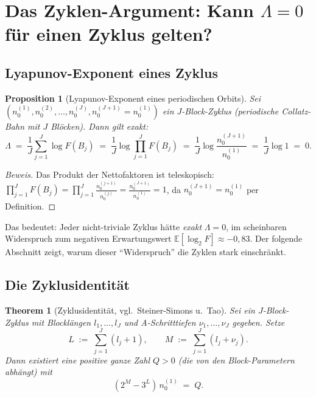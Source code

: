 \documentclass[12pt,a4paper]{article}
\newtheorem{proposition}[definition]{Proposition}
\newtheorem{theorem}[definition]{Theorem}
\newenvironment{beweis}{\begin{proof}[Beweis]}{\end{proof}}
\newcommand{\E}{\mathbb{E}}
\newcommand{\logt}{\log_2}        %
\begin{document}
\section{Das Zyklen-Argument: Kann \texorpdfstring{$\Lambda = 0$}{Lambda = 0} für einen Zyklus gelten?}
\label{sec:zyklen}

\subsection{Lyapunov-Exponent eines Zyklus}

\begin{proposition}[Lyapunov-Exponent eines periodischen Orbits]
\label{prop:zyklus-lambda}
Sei $(n_0^{(1)}, n_0^{(2)}, \ldots, n_0^{(J)}, n_0^{(J+1)} = n_0^{(1)})$
ein $J$-Block-Zyklus (periodische Collatz-Bahn mit $J$ Blöcken). Dann gilt
exakt:
\[
  \Lambda \;=\; \frac{1}{J}\sum_{j=1}^{J}\log F(B_j)
           \;=\; \frac{1}{J}\log\prod_{j=1}^{J}F(B_j)
           \;=\; \frac{1}{J}\log\frac{n_0^{(J+1)}}{n_0^{(1)}}
           \;=\; \frac{1}{J}\log 1 \;=\; 0.
\]
\end{proposition}

\begin{beweis}
Das Produkt der Nettofaktoren ist teleskopisch:
$\prod_{j=1}^{J} F(B_j) = \prod_{j=1}^{J} \frac{n_0^{(j+1)}}{n_0^{(j)}}
= \frac{n_0^{(J+1)}}{n_0^{(1)}} = 1$, da $n_0^{(J+1)} = n_0^{(1)}$ per Definition.
\end{beweis}

Das bedeutet: Jeder nicht-triviale Zyklus hätte \emph{exakt} $\Lambda = 0$,
im scheinbaren Widerspruch zum negativen Erwartungswert $\E[\logt F] \approx -0{,}83$.
Der folgende Abschnitt zeigt, warum dieser ``Widerspruch'' die Zyklen
stark einschränkt.

\subsection{Die Zyklusidentität}

\begin{theorem}[Zyklusidentität, vgl.\ Steiner-Simons u.\ Tao]
\label{thm:zyklusidentität}
Sei ein $J$-Block-Zyklus mit Blocklängen $l_1, \ldots, l_J$ und
A-Schritttiefen $\nu_1, \ldots, \nu_J$ gegeben. Setze
\[
  L \;:=\; \sum_{j=1}^{J}(l_j+1), \qquad
  M \;:=\; \sum_{j=1}^{J}(l_j+\nu_j).
\]
Dann existiert eine positive ganze Zahl $Q > 0$ (die von den Block-Parametern
abhängt) mit
\begin{equation}
  (2^M - 3^L)\,n_0^{(1)} \;=\; Q. \label{eq:zyklusidentität}
\end{equation}
\end{theorem}
\end{document}
